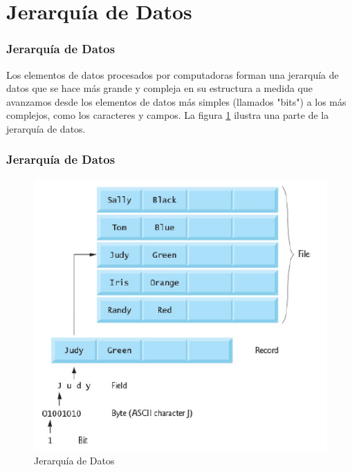 \documentclass[xcolor=table]{beamer}
\begin{document}
\section{Jerarquía de Datos}
\begin{frame}
\frametitle{Jerarquía de Datos}
Los elementos de datos procesados por computadoras forman una jerarquía de datos que se hace más grande y compleja en su estructura a medida que avanzamos desde los elementos de datos más simples (llamados "bits") a los más complejos, como los caracteres y campos. La figura \ref{fig:jeraquia} ilustra una parte de la jerarquía de datos. \cite{deitel}
\end{frame}

\begin{frame}
\frametitle{Jerarquía de Datos}
\begin{figure}
    \centering
    \includegraphics[scale=0.5]{images/dataHierarchy.png}
    \caption{Jerarquía de Datos \cite{deitel} }
    \label{fig:jeraquia}
\end{figure}
\end{frame}
\end{document}
